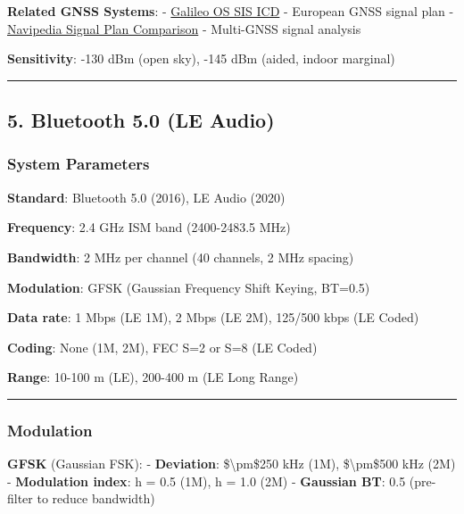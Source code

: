 \textbf{Related GNSS Systems}: -
\href{https://www.gsc-europa.eu/sites/default/files/sites/all/files/Galileo_OS_SIS_ICD_v2.0.pdf}{Galileo
OS SIS ICD} - European GNSS signal plan -
\href{https://gssc.esa.int/navipedia/index.php?title=GALILEO_Signal_Plan}{Navipedia
Signal Plan Comparison} - Multi-GNSS signal analysis

\textbf{Sensitivity}: -130 dBm (open sky), -145 dBm (aided, indoor
marginal)

\begin{center}\rule{0.5\linewidth}{0.5pt}\end{center}

\subsection{5. Bluetooth 5.0 (LE Audio)}\label{bluetooth-5.0-le-audio}

\subsubsection{System Parameters}\label{system-parameters-4}

\textbf{Standard}: Bluetooth 5.0 (2016), LE Audio (2020)

\textbf{Frequency}: 2.4 GHz ISM band (2400-2483.5 MHz)

\textbf{Bandwidth}: 2 MHz per channel (40 channels, 2 MHz spacing)

\textbf{Modulation}: GFSK (Gaussian Frequency Shift Keying, BT=0.5)

\textbf{Data rate}: 1 Mbps (LE 1M), 2 Mbps (LE 2M), 125/500 kbps (LE
Coded)

\textbf{Coding}: None (1M, 2M), FEC S=2 or S=8 (LE Coded)

\textbf{Range}: 10-100 m (LE), 200-400 m (LE Long Range)

\begin{center}\rule{0.5\linewidth}{0.5pt}\end{center}

\subsubsection{Modulation}\label{modulation}

\textbf{GFSK} (Gaussian FSK): - \textbf{Deviation}:
\$\textbackslash pm\$250 kHz (1M), \$\textbackslash pm\$500 kHz (2M) -
\textbf{Modulation index}: h = 0.5 (1M), h = 1.0 (2M) - \textbf{Gaussian
BT}: 0.5 (pre-filter to reduce bandwidth)

